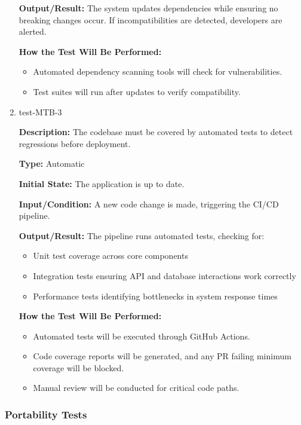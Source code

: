 \documentclass[12pt, titlepage]{article}
\begin{document}
\begin{enumerate}
\textbf{Output/Result:} The system updates dependencies while ensuring no breaking changes occur. If incompatibilities are detected, developers are alerted.

\textbf{How the Test Will Be Performed:}
\begin{itemize}
    \item Automated dependency scanning tools will check for vulnerabilities.
    \item Test suites will run after updates to verify compatibility.
\end{itemize}

\item{test-MTB-3\\}

\textbf{Description:} The codebase must be covered by automated tests to detect regressions before deployment.

\textbf{Type:} Automatic

\textbf{Initial State:} The application is up to date.

\textbf{Input/Condition:} A new code change is made, triggering the CI/CD pipeline.

\textbf{Output/Result:} The pipeline runs automated tests, checking for:
\begin{itemize}
    \item Unit test coverage across core components
    \item Integration tests ensuring API and database interactions work correctly
    \item Performance tests identifying bottlenecks in system response times
\end{itemize}

\textbf{How the Test Will Be Performed:} 
\begin{itemize}
    \item Automated tests will be executed through GitHub Actions.
    \item Code coverage reports will be generated, and any PR failing minimum coverage will be blocked.
    \item Manual review will be conducted for critical code paths.
\end{itemize}

\end{enumerate}

\subsubsection{Portability Tests}
\end{document}
